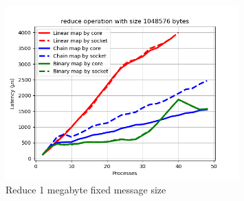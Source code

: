 \begin{figure}[h!]
    \centering
    \includegraphics[width=0.8\textwidth]{../plots/reduce_fixedSize1048576.png}
    \caption{Reduce 1 megabyte fixed message size}
    \label{fig:reduce_fixed_message_size_1048576}
\end{figure}
